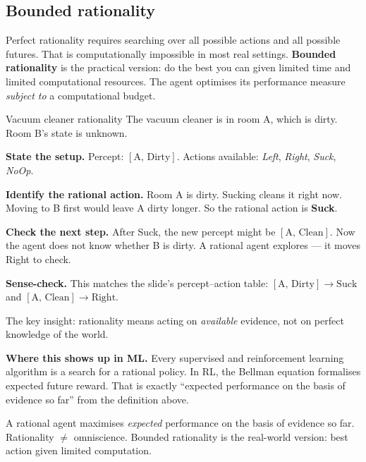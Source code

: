 \documentclass[a4paper,11pt]{article}
\newcommand{\vocab}[1]{\textbf{\color{navy}#1}}
\begin{document}
\subsection{Bounded rationality}

Perfect rationality requires searching over all possible actions and all
possible futures.
That is computationally impossible in most real settings.
\vocab{Bounded rationality} is the practical version: do the best you
can given limited time and limited computational resources.
The agent optimises its performance measure \emph{subject to} a computational
budget.

\begin{worked}{Vacuum cleaner rationality}
The vacuum cleaner is in room A, which is dirty. Room B's state is unknown.
\begin{steps}
  \item \textbf{State the setup.}
        Percept: $[\text{A, Dirty}]$.
        Actions available: \textit{Left}, \textit{Right}, \textit{Suck},
        \textit{NoOp}.
  \item \textbf{Identify the rational action.}
        Room A is dirty. Sucking cleans it right now.
        Moving to B first would leave A dirty longer.
        So the rational action is \textbf{Suck}.
  \item \textbf{Check the next step.}
        After Suck, the new percept might be $[\text{A, Clean}]$.
        Now the agent does not know whether B is dirty.
        A rational agent explores --- it moves Right to check.
  \item \textbf{Sense-check.}
        This matches the slide's percept--action table:
        $[\text{A, Dirty}] \to \text{Suck}$ and
        $[\text{A, Clean}] \to \text{Right}$.
\end{steps}
The key insight: rationality means acting on \emph{available} evidence, not
on perfect knowledge of the world.
\end{worked}

\textbf{Where this shows up in ML.}
Every supervised and reinforcement learning algorithm is a search for a
rational policy.
In RL, the Bellman equation formalises expected future reward.
That is exactly ``expected performance on the basis of evidence so far''
from the definition above.

\begin{keytake}
A rational agent maximises \emph{expected} performance on the basis of
evidence so far. Rationality $\ne$ omniscience. Bounded rationality is the
real-world version: best action given limited computation.
\end{keytake}
\end{document}
